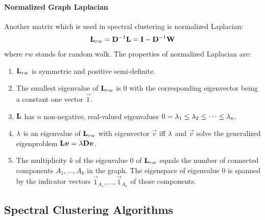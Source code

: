 \paragraph{Normalized Graph Laplacian}

Another matrix which is used in spectral clustering is normalized Laplacian:
\begin{align*}
	\mathbf{L}_{rw}=\mathbf{D}^{-1}\mathbf{L}=\mathbf{I}-\mathbf{D}^{-1}\mathbf{W}
\end{align*}
where $rw$ stands for random walk. The properties of normalized Laplacian are:
\begin{enumerate}
	\item $\mathbf{L}_{rw}$ is symmetric and positive semi-definite.
	\item The smallest eigenvalue of $\mathbf{L}_{rw}$ is 0 with the corresponding eigenvector being a constant one vector $\vec{1}$.
	\item $\mathbf{L}$ has $n$ non-negative, real-valued eigenvalues $0=\lambda_1\leq\lambda_2\leq\cdots\leq\lambda_n$.
	\item $\lambda$ is an eigenvalue of $\mathbf{L}_{rw}$ with eigenvector $\vec{v}$ iff $\lambda$ and $\vec{v}$ solve the generalized eigenproblem $\mathbf{L}\boldsymbol{v}=\lambda\mathbf{D}\boldsymbol{v}$.
	\item The multiplicity $k$ of the eigenvalue 0 of $\mathbf{L}_{rw}$ equals the number of connected components $A_1,\dotsc,A_k$ in the graph. The eigenspace of eigenvalue 0 is spanned by the indicator vectors $\vec{1}_{A_1},\dotsc,\vec{1}_{A_k}$ of those components.
\end{enumerate}

\subsection{Spectral Clustering Algorithms}

